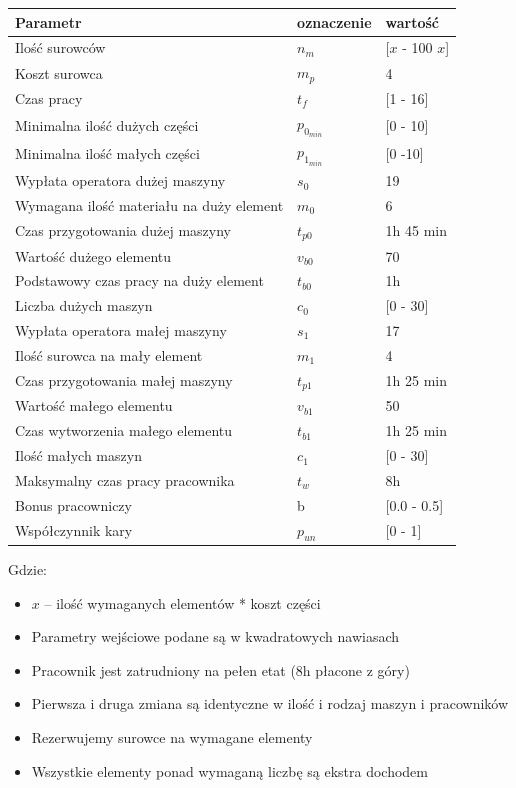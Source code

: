 \documentclass[a4paper]{article}
\begin{document}
\begin{longtable}[c]{lll}
Parametr & oznaczenie & wartość\\ \hline
Ilość surowców & $n_m$ & [$x$ - 100 $x$]\\
Koszt surowca & $m_p$ & 4\\
Czas pracy & $t_f$ & [1 - 16]\\
Minimalna ilość dużych części & $p_{0_{min}}$ & [0 - 10]\\
Minimalna ilość małych części & $p_{1_{min}}$ & [0 -10]\\
Wypłata operatora dużej maszyny & $s_0$ & 19\\
Wymagana ilość materiału na duży element & $m_0$ & 6\\
Czas przygotowania dużej maszyny & $t_{p0}$ & 1h 45 min\\
Wartość dużego elementu & $v_{b0}$ & 70\\
Podstawowy czas pracy na duży element & $t_{b0}$ & 1h\\
Liczba dużych maszyn & $c_0$ & [0 - 30]\\
Wypłata operatora małej maszyny & $s_1$ & 17\\
Ilość surowca na mały element & $m_1$ & 4\\
Czas przygotowania małej maszyny & $t_{p1}$ & 1h 25 min\\
Wartość małego elementu & $v_{b1}$ & 50\\
Czas wytworzenia małego elementu & $t_{b1}$ & 1h 25 min\\
Ilość małych maszyn & $c_1$ & [0 - 30]\\
Maksymalny czas pracy pracownika & $t_w$ & 8h\\
Bonus pracowniczy & b & [0.0 - 0.5]\\
Współczynnik kary & $p_{un}$ & [0 - 1]
\end{longtable}

Gdzie:
\begin{itemize}
    \item $x$ -- ilość wymaganych elementów * koszt części 
    \item Parametry wejściowe podane są w kwadratowych nawiasach
    \item Pracownik jest zatrudniony na pełen etat (8h płacone z góry)
    \item Pierwsza i druga zmiana są identyczne w ilość i rodzaj maszyn i pracowników
    \item Rezerwujemy surowce na wymagane elementy
    \item Wszystkie elementy ponad wymaganą liczbę są ekstra dochodem
\end{itemize}
\end{document}
